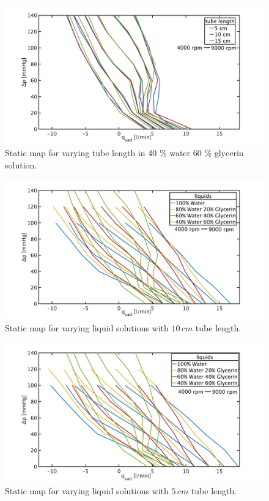 \begin{figure}[ht!]
  \includegraphics[width=\textwidth]{images/chapt_4/40w60g_tube_length_new.pdf}
  \caption[Static map for different tube length in 40 \% water 60 \% glycerin solution]{Static map for varying tube length in 40 \% water 60 \% glycerin solution.}
    \label{fig:anh_3}
\end{figure}

\begin{figure}[ht!]
  \includegraphics[width=\textwidth]{images/chapt_4/medium_liquid_change_new.pdf}
  \caption[Static map for varying liquid solutions with $10\,cm$ tube length]{Static map for varying liquid solutions with $10\,cm$ tube length.}
    \label{fig:anh_4}
\end{figure}

\begin{figure}[ht!]
  \includegraphics[width=\textwidth]{images/chapt_4/short_liquid_change_new.pdf}
  \caption[Static map for varying liquid solutions with $5\,cm$ tube length]{Static map for varying liquid solutions with $5\,cm$ tube length.}
    \label{fig:anh_5}
\end{figure}

